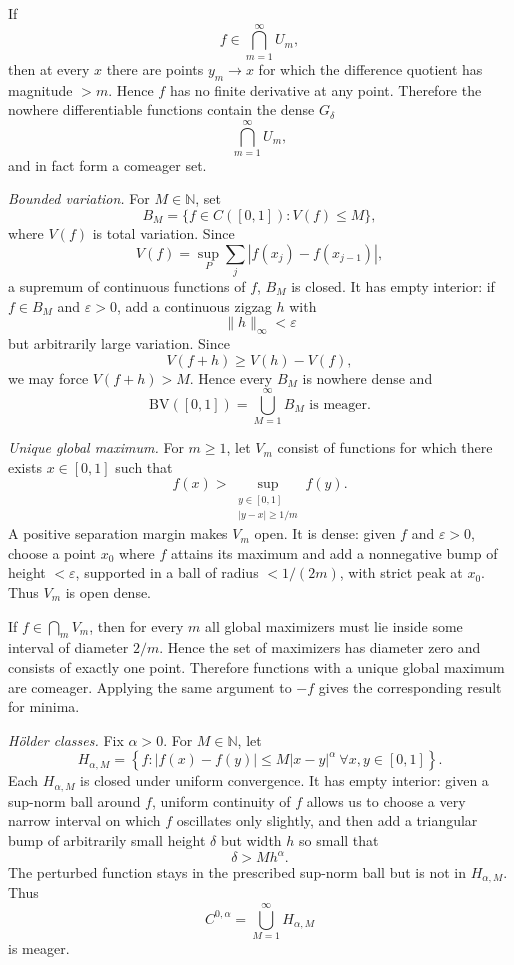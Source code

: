 \begin{solution}
If
\[
f\in\bigcap_{m=1}^\infty U_m,
\]
then at every \(x\) there are points \(y_m\to x\) for which the difference
quotient has magnitude \(>m\). Hence \(f\) has no finite derivative at any
point. Therefore the nowhere differentiable functions contain the dense
\(G_\delta\)
\[
\bigcap_{m=1}^\infty U_m,
\]
and in fact form a comeager set.

\smallskip
\noindent\emph{Bounded variation.}
For \(M\in\mathbb N\), set
\[
B_M
=
\{f\in C([0,1]):V(f)\le M\},
\]
where \(V(f)\) is total variation. Since
\[
V(f)
=
\sup_P\sum_j|f(x_j)-f(x_{j-1})|,
\]
a supremum of continuous functions of \(f\), \(B_M\) is closed.
It has empty interior: if \(f\in B_M\) and \(\varepsilon>0\), add a continuous
zigzag \(h\) with
\[
\|h\|_\infty<\varepsilon
\]
but arbitrarily large variation. Since
\[
V(f+h)\ge V(h)-V(f),
\]
we may force \(V(f+h)>M\). Hence every \(B_M\) is nowhere dense and
\[
\boxed{\mathrm{BV}([0,1])=\bigcup_{M=1}^\infty B_M
\text{ is meager}.}
\]

\smallskip
\noindent\emph{Unique global maximum.}
For \(m\ge1\), let \(V_m\) consist of functions for which there exists
\(x\in[0,1]\) such that
\[
f(x)>
\sup_{\substack{y\in[0,1]\\ |y-x|\ge1/m}}f(y).
\]
A positive separation margin makes \(V_m\) open. It is dense: given \(f\)
and \(\varepsilon>0\), choose a point \(x_0\) where \(f\) attains its
maximum and add a nonnegative bump of height \(<\varepsilon\), supported in
a ball of radius \(<1/(2m)\), with strict peak at \(x_0\).
Thus \(V_m\) is open dense.

If \(f\in\bigcap_mV_m\), then for every \(m\) all global maximizers must lie
inside some interval of diameter \(2/m\). Hence the set of maximizers has
diameter zero and consists of exactly one point. Therefore functions with a
unique global maximum are comeager. Applying the same argument to \(-f\)
gives the corresponding result for minima.

\smallskip
\noindent\emph{Hölder classes.}
Fix \(\alpha>0\). For \(M\in\mathbb N\), let
\[
H_{\alpha,M}
=
\left\{
f:
|f(x)-f(y)|
\le
M|x-y|^\alpha
\ \forall x,y\in[0,1]
\right\}.
\]
Each \(H_{\alpha,M}\) is closed under uniform convergence. It has empty
interior: given a sup-norm ball around \(f\), uniform continuity of \(f\)
allows us to choose a very narrow interval on which \(f\) oscillates only
slightly, and then add a triangular bump of arbitrarily small height
\(\delta\) but width \(h\) so small that
\[
\delta>M h^\alpha.
\]
The perturbed function stays in the prescribed sup-norm ball but is not in
\(H_{\alpha,M}\). Thus
\[
C^{0,\alpha}
=
\bigcup_{M=1}^\infty H_{\alpha,M}
\]
is meager.


\end{solution}

